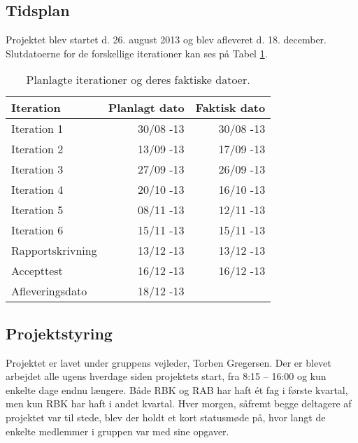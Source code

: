 \documentclass[Main]{subfiles}
\begin{document}
\newpage
\subsection{Tidsplan}
Projektet blev startet d. 26. august 2013 og blev afleveret d. 18. december.
Slutdatoerne for de forskellige iterationer kan ses på Tabel \ref{Tab:Tidsplan}.

\begin{table}[H]
\centering
	\begin{tabular}{l r r}
	\hline
	\textbf{Iteration} & \textbf{Planlagt dato} & \textbf{Faktisk dato} \\ \hline
	Iteration 1 & 30/08 -13 & 30/08 -13\\
	Iteration 2 & 13/09 -13 & 17/09 -13\\
	Iteration 3 & 27/09 -13 & 26/09 -13\\
	Iteration 4 & 20/10 -13 & 16/10 -13\\
	Iteration 5 & 08/11 -13 & 12/11 -13\\
	Iteration 6 & 15/11 -13 & 15/11 -13\\
	Rapportskrivning & 13/12 -13 & 13/12 -13 \\
	Accepttest	& 16/12 -13 & 16/12 -13\\
	Afleveringsdato & 18/12 -13 & 
	\\ \hline
	\end{tabular}
\caption{Planlagte iterationer og deres faktiske datoer.}
\label{Tab:Tidsplan}
\end{table}


\subsection{Projektstyring}
Projektet er lavet under gruppens vejleder, Torben Gregersen.
Der er blevet arbejdet alle ugens hverdage siden projektets start, fra 8:15 -- 16:00 og kun enkelte dage endnu længere.
Både RBK og RAB har haft ét fag i første kvartal, men kun RBK har haft i andet kvartal.
Hver morgen, såfremt begge deltagere af projektet var til stede, blev der holdt et kort statusmøde på, hvor langt de enkelte medlemmer i gruppen var med sine opgaver.
\end{document}
